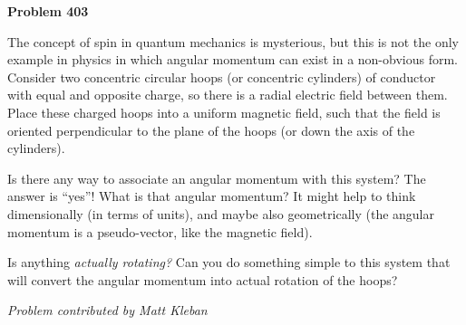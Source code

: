 \documentclass[12pt]{article}
\begin{document}
\begin{pottproblem}
\textbf{Problem 403}

The concept of spin in quantum mechanics is mysterious, but this is
not the only example in physics in which angular momentum can exist in
a non-obvious form.
Consider two concentric circular hoops (or concentric cylinders) of
conductor with equal and opposite charge, so there is a radial
electric field between them.
Place these charged hoops into a uniform magnetic field, such that the field is
oriented perpendicular to the plane of the hoops (or down the axis of
the cylinders).

Is there any way to associate an angular momentum with this system?
The answer is ``yes''!
What is that angular momentum?
It might help to think dimensionally (in terms of units), and maybe also
geometrically (the angular momentum is a pseudo-vector, like the magnetic
field).

Is anything \emph{actually rotating?}
Can you do something simple to this system that will convert the
angular momentum into actual rotation of the hoops?

{\normalsize \emph{Problem contributed by Matt Kleban}}

\end{pottproblem}
\end{document}
